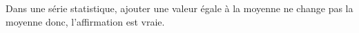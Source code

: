    Dans une série statistique, ajouter une valeur égale à la moyenne ne change pas la moyenne donc, {\blue l'affirmation est vraie}.
